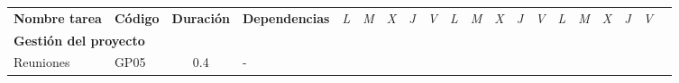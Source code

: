 \begin{longtable}[c]{llclllllllllllllllll}
        \multicolumn{1}{|c|}{\multirow{-2}{*}{\textbf{Nombre tarea}}}                                                           & \multicolumn{1}{c|}{\multirow{-2}{*}{\textbf{Código}}}                         & \multicolumn{1}{c|}{\multirow{-2}{*}{\textbf{Duración}}}                         & \multicolumn{1}{c|}{\multirow{-2}{*}{\textbf{Dependencias}}}                         & \multicolumn{1}{l|}{\textit{L}} & \multicolumn{1}{l|}{\textit{M}} & \multicolumn{1}{l|}{\textit{X}} & \multicolumn{1}{l|}{\textit{J}} & \multicolumn{1}{l|}{\textit{V}} & \multicolumn{1}{l|}{\textit{L}} & \multicolumn{1}{l|}{\textit{M}} & \multicolumn{1}{l|}{\textit{X}} & \multicolumn{1}{l|}{\textit{J}} & \multicolumn{1}{l|}{\textit{V}} & \multicolumn{1}{l|}{\textit{L}} & \multicolumn{1}{l|}{\textit{M}} & \multicolumn{1}{l|}{\textit{X}} & \multicolumn{1}{l|}{\textit{J}} & \multicolumn{1}{l|}{\textit{V}}               &  \\ \cline{1-19}
        \multicolumn{4}{|l|}{\textbf{Gestión del proyecto}}                                                                                                                                                                                                                                                                                                                                & \multicolumn{15}{l|}{}                                                                                                                                                                                                                                                                                                                                                                                                                                                                                                                    &  \\ \cline{1-19}
        \multicolumn{1}{|l|}{Reuniones}                                                                                         & \multicolumn{1}{l|}{GP05}                                                      & \multicolumn{1}{c|}{0.4}                                                         & \multicolumn{1}{l|}{-}                                                               &                                 &                                 &                                 & \cellcolor[HTML]{EF8787}        &                                 &                                 &                                 &                                 &                                 &                                 &                                 &                                 &                                 & \cellcolor[HTML]{EF8787}        & \multicolumn{1}{l|}{}                         &  \\ \cline{1-19}

\end{longtable}
